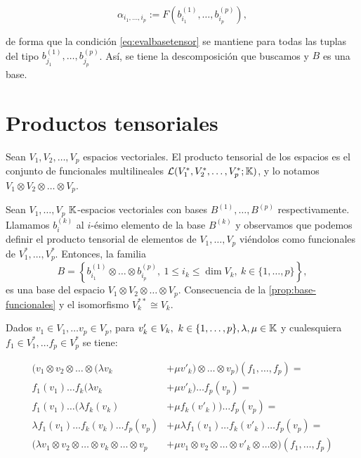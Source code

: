 \begin{equation*}
\alpha_{i_1,\dots,i_p}:=F\left(b_{i_1}^{(1)},\dots,b_{i_p}^{(p)}\right),
\end{equation*}

de forma que la condición \eqref{eq:evalbasetensor} se mantiene para
todas las tuplas del tipo \(b_{j_1}^{(1)},\dots,b_{j_p}^{(p)}\). Así, se
tiene la descomposición que buscamos y \(B\) es una base.

\proofe

\prope

\section{Productos tensoriales}\label{productos-tensoriales}

Sean \(V_1,V_2,\dots,V_p\) espacios vectoriales. El producto tensorial
de los espacios es el conjunto de funcionales multilineales
\(\mathcal{L}(V_1^*,V_2^*,\dots,V_p^*;\mathbb{K})\), y lo notamos
\(V_1\otimes V_2\otimes\dots\otimes V_p\). 

\corb
Sean \(V_1,\dots,V_p\) \(\mathbb{K}\)-espacios vectoriales con bases
\(B^{(1)},\dots,B^{(p)}\) respectivamente. Llamamos \(b_i^{(k)}\) al
\(i\)-ésimo elemento de la base \(B^{(k)}\) y observamos que podemos
definir el producto tensorial de elementos de \(V_1,\dots,V_p\)
viéndolos como funcionales de \(V_1^*,\dots,V_p^*\). Entonces, la
familia
\[B=\left\{b_{i_1}^{(1)}\otimes\dots\otimes b_{i_p}^{(p)},\ 1\leq i_k\leq\dim{V_k},\ k\in\{1,\dots,p\}\right\},\]
es una base del espacio \(V_1\otimes V_2\otimes\dots\otimes V_p\).
\proofb
Consecuencia de la \autoref{prop:base-funcionales} y el
isomorfismo \(V_k^{**}\cong V_k\). \proofe
\core

\remb
Dados \(v_1\in V_1,\dots v_p\in V_p\), para
\(v'_k\in V_k,\ k\in\{1,\dots,p\},\lambda,\mu\in\KK\) y cualesquiera
\(f_1\in V_1^*,\dots f_p\in V_p^*\) se tiene:

\begin{align*}
  (v_1\otimes v_2\otimes\dots\otimes(\lambda v_k &+ \mu v'_k)\otimes\dots\otimes v_p)(f_1,\dots,f_p)=\\
  f_1(v_1)\dots f_k(\lambda v_k &+ \mu v'_k) \dots f_p(v_p) =\\
  f_1(v_1)\dots (\lambda f_k(v_k) &+ \mu f_k(v'_k)) \dots f_p(v_p) = \\
  \lambda f_1(v_1)\dots f_k(v_k) \dots f_p(v_p) &+ \mu \lambda f_1(v_1)\dots f_k(v'_k) \dots f_p(v_p) =\\
  (\lambda v_1\otimes v_2\otimes\dots\otimes v_k\otimes\dots\otimes v_p &+\mu v_1\otimes v_2\otimes\dots\otimes v'_k\otimes\dots\otimes)(f_1,\dots,f_p)
\end{align*}

